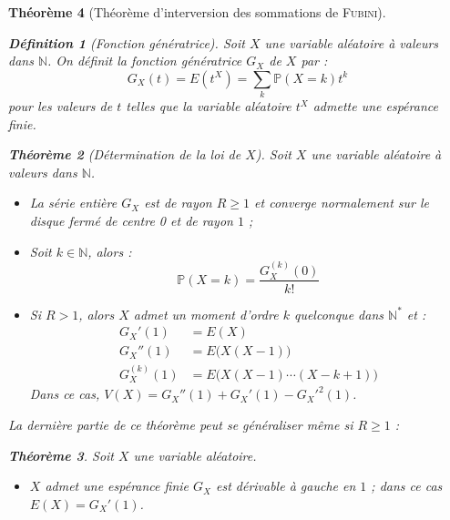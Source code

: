 \documentclass[11pt,a4paper]{report}
\newtheorem{theorem}{Théorème}[chapter]
\newtheorem{itheorem}[theorem]{Théorème}
\theoremstyle{definition}
\newtheorem{dfn}[theorem]{Définition}
\begin{document}
\begin{theorem}[Théorème d'interversion des sommations de \textsc{Fubini}]
{{%
\begin{dfn}[Fonction génératrice] %
     Soit $X$ une variable aléatoire à valeurs dans $\mathbb{N}$. On définit la \emph{fonction génératrice} $G_X$ de $X$ par : 
     \begin{equation}
     G_X (t) = E(t^X) = \sum_k \mathbb{P} (X=k) t^k
     \end{equation}
     pour les valeurs de $t$ telles que la variable aléatoire $t^X$ admette une espérance finie.
\end{dfn}
\begin{theorem}[Détermination de la loi de $X$]
     Soit $X$ une variable aléatoire à valeurs dans $\mathbb{N}$.
     \begin{itemize}[leftmargin=5.5mm]
         \item La série entière $G_X$ est de rayon $R \ge 1$ et converge normalement sur le disque fermé de centre 0 et de rayon $1$ ; 
         \item Soit $k\in \mathbb{N}$, alors : 
         \begin{equation}
         \mathbb{P}(X=k) = \dfrac{G_X^{(k)}(0)}{k!}
         \end{equation}
         \item Si $R > 1$, alors $X$ admet un moment d'ordre $k$ quelconque dans $\mathbb{N}^*$ et :
         \begin{subequations}
         \begin{align}
         G_X'(1) &= E(X) \\ G_X''(1) &= E\big( X(X-1)\big) \\ G_X^{(k)}(1) &= E\Big( X(X-1)\cdots (X-k+1)\Big)
         \end{align}
         \end{subequations}
         Dans ce cas, $V(X) = G_X''(1) + G_X'(1) - G_X'^2(1)$.
     \end{itemize}
\end{theorem}
La dernière partie de ce théorème peut se généraliser même si $R\ge 1$ :
\begin{itheorem}
     Soit $X$ une variable aléatoire.
     \begin{itemize}[leftmargin=5.5mm]
         \item $X$ admet une espérance finie \Longleftrightarrow $G_X$ est dérivable à gauche en $1$ ; dans ce cas $E(X) = G_X'(1)$.

\end{itemize}
\end{itheorem}}}
\end{theorem}
\end{document}
